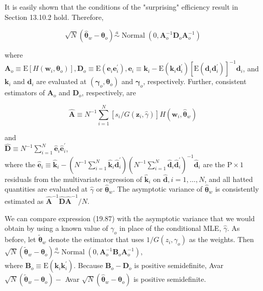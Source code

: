 \documentclass[10pt]{article}
\begin{document}
It is easily shown that the conditions of the "surprising" efficiency result in Section 13.10.2 hold. Therefore,


\begin{equation*}
\sqrt{N}\left(\hat{\boldsymbol{\theta}}_{w}-\boldsymbol{\theta}_{o}\right) \stackrel{a}{\sim} \operatorname{Normal}\left(0, \mathbf{A}_{o}^{-1} \mathbf{D}_{o} \mathbf{A}_{o}^{-1}\right) \tag{19.87}
\end{equation*}


where $\mathbf{A}_{o} \equiv \mathrm{E}\left[H\left(\mathbf{w}_{i}, \boldsymbol{\theta}_{o}\right)\right], \mathbf{D}_{o} \equiv \mathrm{E}\left(\mathbf{e}_{i} \mathbf{e}_{i}^{\prime}\right), \mathbf{e}_{i} \equiv \mathbf{k}_{i}-\mathrm{E}\left(\mathbf{k}_{i} \mathbf{d}_{i}^{\prime}\right)\left[\mathrm{E}\left(\mathbf{d}_{i} \mathbf{d}_{i}^{\prime}\right)\right]^{-1} \mathbf{d}_{i}$, and $\mathbf{k}_{i}$ and $\mathbf{d}_{i}$ are evaluated at $\left(\boldsymbol{\gamma}_{o}, \boldsymbol{\theta}_{o}\right)$ and $\boldsymbol{\gamma}_{o}$, respectively. Further, consistent estimators of $\mathbf{A}_{o}$ and $\mathbf{D}_{o}$, respectively, are


\begin{equation*}
\hat{\mathbf{A}} \equiv N^{-1} \sum_{i=1}^{N}\left[s_{i} / G\left(\mathbf{z}_{i}, \hat{\gamma}\right)\right] H\left(\mathbf{w}_{i}, \hat{\boldsymbol{\theta}}_{w}\right) \tag{19.88}
\end{equation*}


and\\
$\hat{\mathbf{D}} \equiv N^{-1} \sum_{i=1}^{N} \hat{\mathbf{e}}_{i} \hat{\mathbf{e}}_{i}^{\prime}$,\\
where the $\hat{\mathbf{e}}_{i} \equiv \hat{\mathbf{k}}_{i}-\left(N^{-1} \sum_{i=1}^{N} \hat{\mathbf{k}}_{i} \hat{\mathbf{d}}_{i}^{\prime}\right)\left(N^{-1} \sum_{i=1}^{N} \hat{\mathbf{d}}_{i} \hat{\mathbf{d}}_{i}^{\prime}\right)^{-1} \hat{\mathbf{d}}_{i}$ are the $\mathrm{P} \times 1$ residuals from the multivariate regression of $\hat{\mathbf{k}}_{i}$ on $\hat{\mathbf{d}}, i=1, \ldots, N$, and all hatted quantities are evaluated at $\hat{\gamma}$ or $\hat{\boldsymbol{\theta}}_{w}$. The asymptotic variance of $\hat{\boldsymbol{\theta}}_{w}$ is consistently estimated as $\hat{\mathbf{A}}^{-1} \hat{\mathbf{D}} \hat{\mathbf{A}}^{-1} / N$.

We can compare expression (19.87) with the asymptotic variance that we would obtain by using a known value of $\gamma_{o}$ in place of the conditional MLE, $\hat{\gamma}$. As before, let $\tilde{\boldsymbol{\theta}}_{w}$ denote the estimator that uses $1 / G\left(z_{i}, \gamma_{o}\right)$ as the weights. Then\\
$\sqrt{N}\left(\tilde{\boldsymbol{\theta}}_{w}-\boldsymbol{\theta}_{o}\right) \stackrel{a}{\sim} \operatorname{Normal}\left(0, \mathbf{A}_{o}^{-1} \mathbf{B}_{o} \mathbf{A}_{o}^{-1}\right)$,\\
where $\mathbf{B}_{o} \equiv \mathrm{E}\left(\mathbf{k}_{i} \mathbf{k}_{i}^{\prime}\right)$. Because $\mathbf{B}_{o}-\mathbf{D}_{o}$ is positive semidefinite, Avar $\sqrt{N}\left(\tilde{\boldsymbol{\theta}}_{w}-\boldsymbol{\theta}_{o}\right)-$ Avar $\sqrt{N}\left(\hat{\boldsymbol{\theta}}_{w}-\boldsymbol{\theta}_{o}\right)$ is positive semidefinite.
\end{document}
